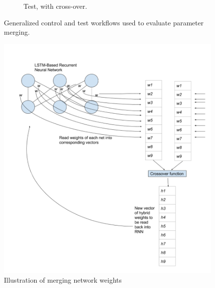 \begin{figure}[h!]
\begin{subfigure}[h]{0.49\linewidth}
\caption{Test, with cross-over.}
\end{subfigure}%
\caption{Generalized control and test workflows used to evaluate parameter merging.}
\end{figure}

\begin{figure}[h!]
\includegraphics[width=\linewidth]{figures/merge.png}
\caption{Illustration of merging network weights}
\end{figure}